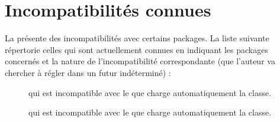 \chapter{Incompatibilités connues}
\label{cha-incomp-conn}
%

La \yatCl{} présente des incompatibilités avec certains packages.  La liste
suivante répertorie %
celles qui sont actuellement connues %
en indiquant
les packages concernés %
et la nature de l'incompatibilité correspondante (que l'auteur va chercher
à régler dans un futur indéterminé) :
\begin{description}
\item[] qui est incompatible avec le  que
  charge automatiquement la classe.
\item[] qui est incompatible avec le  que
  charge automatiquement la classe.
\end{description}
